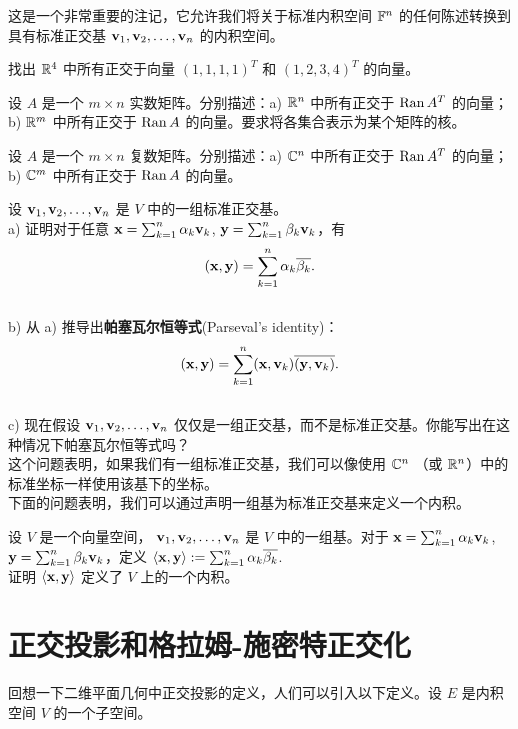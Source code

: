 这是一个非常重要的注记，它允许我们将关于标准内积空间 $\mathbb{F}^n$ 的任何陈述转换到具有标准正交基 $\mathbf{v}_1, \mathbf{v}_2, \dots, \mathbf{v}_n$ 的内积空间。

\begin{problemset}
\item \label{ex:05-02-01} 找出 $\mathbb{R}^4$ 中所有正交于向量 $(1, 1, 1, 1)^T$ 和 $(1, 2, 3, 4)^T$ 的向量。
\item \label{ex:05-02-02} 设 $A$ 是一个 $m \times n$ 实数矩阵。分别描述：a) $\mathbb{R}^n$ 中所有正交于 $\operatorname{Ran} A^T$ 的向量；b) $\mathbb{R}^m$ 中所有正交于 $\operatorname{Ran} A$ 的向量。要求将各集合表示为某个矩阵的核。
\item \label{ex:05-02-03} 设 $A$ 是一个 $m \times n$ 复数矩阵。分别描述：a) $\mathbb{C}^n$ 中所有正交于 $\operatorname{Ran} A^T$ 的向量；b) $\mathbb{C}^m$ 中所有正交于 $\operatorname{Ran} A$ 的向量。
\item \label{ex:05-02-04} 设 $\mathbf{v}_1, \mathbf{v}_2, \dots, \mathbf{v}_n$ 是 $V$ 中的一组标准正交基。
\\
    a) 证明对于任意 $\mathbf{x} = \sum_{k=1}^n \alpha_k \mathbf{v}_k$, $\mathbf{y} = \sum_{k=1}^n \beta_k \mathbf{v}_k$，有
    $$(\mathbf{x}, \mathbf{y}) = \sum_{k=1}^n \alpha_k \overline{\beta_k}.$$
    \\
    b) 从 a) 推导出\textbf{帕塞瓦尔恒等式}(Parseval’s identity)：$$(\mathbf{x}, \mathbf{y}) = \sum_{k=1}^n (\mathbf{x}, \mathbf{v}_k)\overline{(\mathbf{y}, \mathbf{v}_k)}.$$
    \\
    c) 现在假设 $\mathbf{v}_1, \mathbf{v}_2, \dots, \mathbf{v}_n$ 仅仅是一组正交基，而不是标准正交基。你能写出在这种情况下帕塞瓦尔恒等式吗？
    \\
这个问题表明，如果我们有一组标准正交基，我们可以像使用 $\mathbb{C}^n$ （或 $\mathbb{R}^n$）中的标准坐标一样使用该基下的坐标。
\\
下面的问题表明，我们可以通过声明一组基为标准正交基来定义一个内积。
\item \label{ex:05-02-05} 设 $V$ 是一个向量空间， $\mathbf{v}_1, \mathbf{v}_2, \dots, \mathbf{v}_n$ 是 $V$ 中的一组基。对于 $\mathbf{x} = \sum_{k=1}^n \alpha_k \mathbf{v}_k$, $\mathbf{y} = \sum_{k=1}^n \beta_k \mathbf{v}_k$，定义 $\langle \mathbf{x}, \mathbf{y} \rangle := \sum_{k=1}^n \alpha_k \overline{\beta_k}$.~
\\
证明 $\langle \mathbf{x}, \mathbf{y} \rangle$ 定义了 $V$ 上的一个内积。
\end{problemset}


\section{正交投影和格拉姆-施密特正交化}\label{sec:05-03}

回想一下二维平面几何中正交投影的定义，人们可以引入以下定义。设 $E$ 是内积空间 $V$ 的一个子空间。


